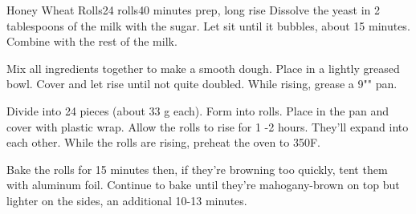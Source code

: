 \documentclass[../Cookbook.tex]{subfiles}
\begin{document}
\begin{recipe}[HoneyWheatRolls]{Honey Wheat Rolls}{24 rolls}{40 minutes prep, long rise}
\renewcommand*{\thefootnote}{\num{footnote}}
	Dissolve the yeast in 2 tablespoons of the milk with the sugar. Let sit until it bubbles, about 15 minutes.
	Combine with the rest of the milk.

	Mix all ingredients together to make a smooth dough.
	Place in a lightly greased bowl.
	Cover and let rise until not quite doubled.
	While rising, grease a 9"" pan.

	Divide into 24 pieces (about 33 g each).
	Form into rolls. Place in the pan and cover with plastic wrap. Allow the rolls to rise for 1 -2 hours. They'll expand into each other.
	While the rolls are rising, preheat the oven to 350\0F.

	Bake the rolls for 15 minutes then, if they're browning too quickly, tent them with aluminum foil.
	Continue to bake until they're mahogany-brown on top but lighter on the sides, an additional 10-13 minutes.
\end{recipe}
\end{document}
